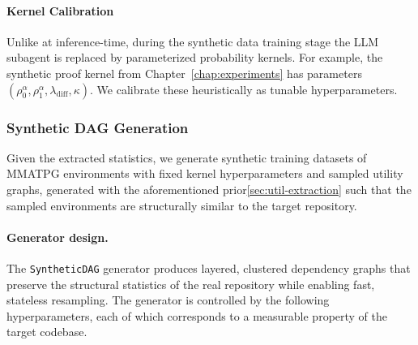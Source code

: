 \paragraph{Kernel Calibration}\label{sec:kernel-calibration}

Unlike at inference-time, during the synthetic data training stage the LLM subagent is replaced by parameterized probability kernels. For example, the synthetic proof kernel from Chapter~\ref{chap:experiments} has parameters $(\rho_0^\alpha, \rho_1^\alpha, \lambda_{\mathrm{diff}}, \kappa)$. We calibrate these heuristically as tunable hyperparameters.



\subsubsection{Synthetic DAG Generation}\label{sec:synthetic-dag}

Given the extracted statistics, we generate synthetic training datasets of MMATPG environments with fixed kernel hyperparameters and sampled utility graphs, generated with the aforementioned prior\ref{sec:util-extraction} such that the sampled environments are structurally similar to the target repository.

\paragraph{Generator design.}


The \texttt{SyntheticDAG} generator produces layered, clustered dependency graphs that preserve the structural statistics of the real repository while enabling fast, stateless resampling. The generator is controlled by the following hyperparameters, each of which corresponds to a measurable property of the target codebase.
 
